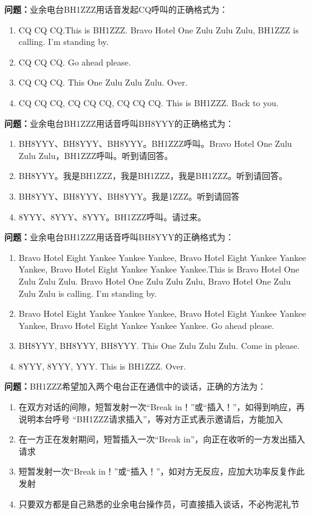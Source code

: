 \bigskip


\noindent\textbf{问题：}业余电台BH1ZZZ用话音发起CQ呼叫的正确格式为：
\begin{enumerate}[label=\Alph*), leftmargin=3em]
\item CQ CQ CQ.This is BH1ZZZ. Bravo Hotel One Zulu Zulu Zulu, BH1ZZZ is calling. I’m standing by.
\item CQ CQ CQ. Go ahead please.
\item CQ CQ CQ. This One Zulu Zulu Zulu. Over.
\item CQ CQ CQ, CQ CQ CQ, CQ CQ CQ. This is BH1ZZZ. Back to you.
\end{enumerate}

\bigskip


\noindent\textbf{问题：}业余电台BH1ZZZ用话音呼叫BH8YYY的正确格式为：
\begin{enumerate}[label=\Alph*), leftmargin=3em]
\item BH8YYY、BH8YYY、BH8YYY。BH1ZZZ呼叫。Bravo Hotel One Zulu Zulu Zulu，BH1ZZZ呼叫。听到请回答。
\item BH8YYY。我是BH1ZZZ，我是BH1ZZZ，我是BH1ZZZ。听到请回答。
\item BH8YYY、BH8YYY、BH8YYY。我是1ZZZ。听到请回答
\item 8YYY、8YYY、8YYY。BH1ZZZ呼叫。请过来。
\end{enumerate}

\bigskip


\noindent\textbf{问题：}业余电台BH1ZZZ用话音呼叫BH8YYY的正确格式为：
\begin{enumerate}[label=\Alph*), leftmargin=3em]
\item Bravo Hotel Eight Yankee Yankee Yankee, Bravo Hotel Eight Yankee Yankee Yankee, Bravo Hotel Eight Yankee Yankee Yankee.This is Bravo Hotel One Zulu Zulu Zulu. Bravo Hotel One Zulu Zulu Zulu, Bravo Hotel One Zulu Zulu Zulu is calling. I’m standing by.
\item Bravo Hotel Eight Yankee Yankee Yankee, Bravo Hotel Eight Yankee Yankee Yankee, Bravo Hotel Eight Yankee Yankee Yankee. Go ahead please.
\item BH8YYY, BH8YYY, BH8YYY. This One Zulu Zulu Zulu. Come in please.
\item 8YYY, 8YYY, YYY. This is BH1ZZZ. Over.
\end{enumerate}

\bigskip


\noindent\textbf{问题：}BH1ZZZ希望加入两个电台正在通信中的谈话，正确的方法为：
\begin{enumerate}[label=\Alph*), leftmargin=3em]
\item 在双方对话的间隙，短暂发射一次“Break in！”或“插入！”，如得到响应，再说明本台呼号 “BH1ZZZ请求插入”，等对方正式表示邀请后，方能加入
\item 在一方正在发射期间，短暂插入一次“Break in”，向正在收听的一方发出插入请求
\item 短暂发射一次“Break in！”或“插入！”，如对方无反应，应加大功率反复作此发射
\item 只要双方都是自己熟悉的业余电台操作员，可直接插入谈话，不必拘泥礼节
\end{enumerate}

